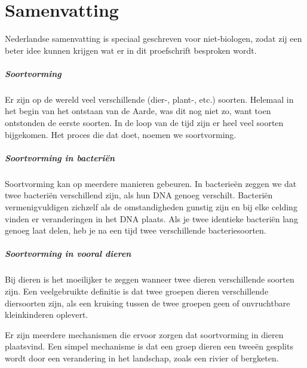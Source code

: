 \chapter*{Samenvatting}

{

\noindent 
{} Nederlandse samenvatting is speciaal geschreven
voor niet-biologen, zodat zij een beter idee kunnen
krijgen wat er in dit proefschrift besproken wordt.

\paragraph{Soortvorming}

Er zijn op de wereld veel verschillende (dier-, plant-, etc.) soorten.
Helemaal in het begin van het ontstaan van de Aarde, 
was dit nog niet zo, want toen ontstonden de eerste soorten.
In de loop van de tijd zijn er heel veel soorten bijgekomen.
Het proces die dat doet, noemen we soortvorming.

\paragraph{Soortvorming in bacteriën}

Soortvorming kan op meerdere manieren gebeuren.
In bacterieën zeggen we dat twee bacteriën verschillend zijn,
als hun DNA genoeg verschilt. Bacteriën vermenigvuldigen zichzelf
als de omstandigheden gunstig zijn en bij elke celding vinden
er veranderingen in het DNA plaats. Als je twee identieke bacteriën
lang genoeg laat delen, heb je na een tijd twee verschillende 
bacteriesoorten.

\paragraph{Soortvorming in vooral dieren}

Bij dieren is het moeilijker te zeggen wanneer twee dieren
verschillende soorten zijn. Een veelgebruikte definitie is dat
twee groepen dieren verschillende diersoorten zijn, als een kruising
tussen de twee groepen geen of onvruchtbare kleinkinderen oplevert.

Er zijn meerdere mechanismen die ervoor zorgen 
dat soortvorming in dieren plaatsvind. 
Een simpel mechanisme is dat een groep dieren een tweeën gesplits
wordt door een verandering in het landschap, 
zoals een rivier of bergketen.

}
